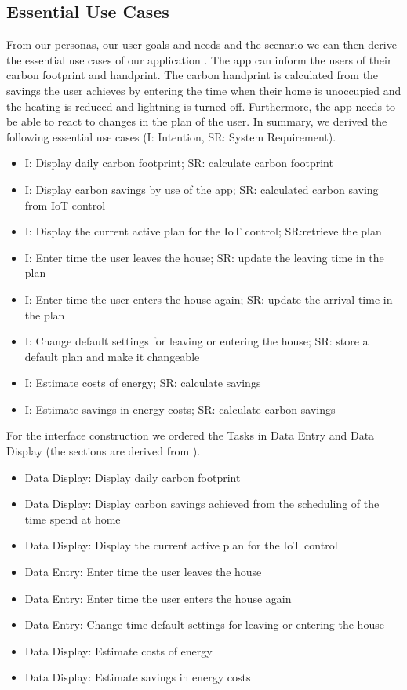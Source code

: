\documentclass[]{interact}
\theoremstyle{plain}%
\theoremstyle{definition}
\theoremstyle{remark}
\begin{document}
\subsection*{Essential Use Cases}

From our personas, our user goals and needs and the scenario we can then derive the essential use cases of our application \citep*{constantine_structure_2000}.
The app can inform the users of their carbon footprint and handprint.
The carbon handprint is calculated from the savings the user achieves by entering the time when their home is unoccupied and the heating is reduced and lightning is turned off.
Furthermore, the app needs to be able to react to changes in the plan of the user.
In summary, we derived the following essential use cases (I: Intention, SR: System Requirement).
\begin{itemize}
  \item I: Display daily carbon footprint; SR: calculate carbon footprint
  \item I: Display carbon savings by use of the app; SR: calculated carbon saving from IoT control
  \item I: Display the current active plan for the IoT control; SR:retrieve the plan
  \item I: Enter time the user leaves the house; SR: update the leaving time in the plan
  \item I: Enter time the user enters the house again; SR: update the arrival time in the plan
  \item I: Change default settings for leaving or entering the house; SR: store a default plan and make it changeable
  \item I: Estimate costs of energy; SR: calculate savings
  \item I: Estimate savings in energy costs; SR: calculate carbon savings
\end{itemize}
For the interface construction we ordered the Tasks in Data Entry and Data Display (the sections are derived from \citeauthor*{smith_guidelines_1986} \citep*{smith_guidelines_1986}).

\begin{itemize}
  \item Data Display: Display daily carbon footprint
  \item Data Display: Display carbon savings achieved from the scheduling of the time spend at home
  \item Data Display: Display the current active plan for the IoT control
  \item Data Entry: Enter time the user leaves the house
  \item Data Entry: Enter time the user enters the house again
  \item Data Entry: Change time default settings for leaving or entering the house
  \item Data Display: Estimate costs of energy
  \item Data Display: Estimate savings in energy costs
\end{itemize}
\end{document}
